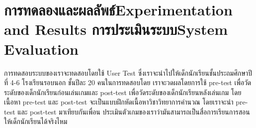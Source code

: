 \chapter{\ifproject%
\ifcpe การทดลองและผลลัพธ์\else Experimentation and Results\fi
\else%
\ifcpe การประเมินระบบ\else System Evaluation\fi
\fi}

การทดสอบระบบของเราจะทดสอบโดยใช้ User Test ซึ่งเราจะนำไปให้เด็กนักเรียนชั้นประถมศึกษาปีที่ 4-6 โรงเรียนรอบนอก
ชั้นปีละ 20 คนในการทดสอบโดย เราจะวดผลโดยการใช้ pre-test เพื่อวัดระดับของเด็กนักเรียนก่อนเล่นเกมและ post-test เพื่อวัดระดับของเด็กนักเรียนหลังเล่นเกม
โดย เนื้อหา pre-test และ post-test จะเป็นแบบฝึกหัดเนื้อหาวิชาวิทยาการคำนวณ โดยเราจะนำ pre-test และ post-test มาเทียบกันเพื่อน
ประเมินตัวเกมของเราว่ามันสามารถเป็นสื่อการเรียนการสอนให้เด็กนักเรียนได้จริงไหม
